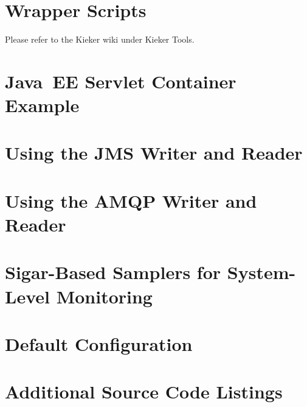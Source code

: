 % 

\newpage
\appendix

{}
\hypertarget{hypertarget:appendix}{}

\chapter{Wrapper Scripts}\label{appendix:wrapperScripts}
Please refer to the Kieker wiki under Kieker Tools.

\chapter{Java~EE Servlet Container Example}\label{appendix:JavaEEServletExample}


\chapter{Using the JMS Writer and Reader}\label{appendix:usingJMS}


\chapter{Using the AMQP Writer and Reader}\label{appendix:usingAMQP}


\chapter{Sigar-Based Samplers for System-Level Monitoring}\label{appendix:SigarBasedSamplers}


\chapter{\KiekerMonitoringPart{} Default Configuration}\label{sec:appdx:monitoringproperties}


\chapter{Additional Source Code Listings}\label{appendix:additionalSourceCode}


